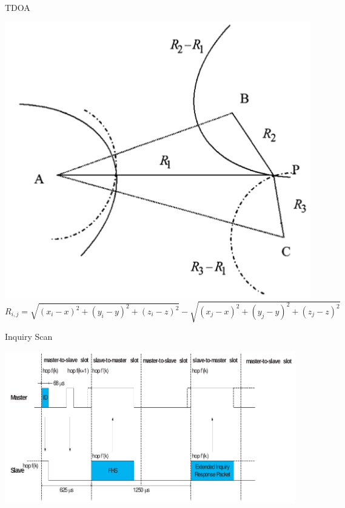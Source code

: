 \documentclass[18pt]{beamer}
\begin{document}
\begin{frame}{TDOA}%
	\begin{minipage}[t][0.8\textheight][t]{\textwidth}
		\centering
		\includegraphics[height=0.6\textheight]{images/tdoa.png}\\
		$R_{i,j} = \sqrt{(x_i - x)^2 + (y_i - y)^2 + (z_i - z)^2} - \sqrt{(x_j - x)^2 + (y_j - y)^2 + (z_j - z)^2}$
	\end{minipage}
\end{frame}

\begin{frame}{Inquiry Scan}%
	\begin{minipage}[t][\textheight][t]{\textwidth}
		\centering
		\includegraphics[width=0.95\textwidth]{images/inqscan.png}
	\end{minipage}
\end{frame}
\end{document}
